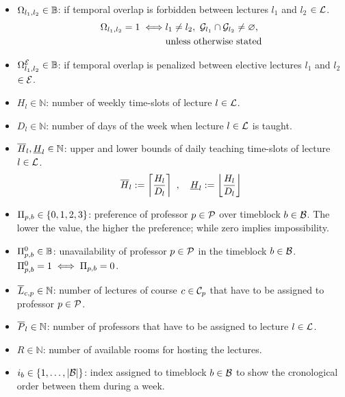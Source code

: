         \begin{itemize}
            \item $\Omega_{l_1,l_2} \in \mathbb{B}$: if temporal overlap is forbidden between lectures $l_1$ and $l_2$ $\in \mathcal{L}$.
            \begin{equation}
                \begin{split}
                    \overlap{l_1}{l_2}=1 \iff & l_1\neq l_2, \ \groups_{l_1} \cap \groups_{l_2} \neq \varnothing, \\                              & \text{unless otherwise stated}
                \end{split}
                \label{eq:overlap_condition}
            \end{equation}
            \item $\Omega_{l_1,l_2}^{\mathcal{E}} \in \mathbb{B}$: if temporal overlap is penalized between elective lectures $l_1$ and $l_2$ $\in \mathcal{E}$.
            \item $H_l \in \mathbb{N}$: number of weekly time-slots of lecture $l\in\mathcal{L}$.
            \item $D_l \in \mathbb{N}$: number of days of the week when lecture $l\in\mathcal{L}$ is taught.
            \item $\overline{H}_{l}, \underline{H}_{l} \in \mathbb{N}$: upper and lower bounds of daily teaching time-slots of lecture $l\in\mathcal{L}$.
            \begin{equation}
                \overline{H}_{l} := \left\lceil \frac{H_l}{D_l} \right\rceil  \ , \quad \underline{H}_{l} :=  \left\lfloor \frac{H_l}{D_l} \right\rfloor
                \nonumber
            \end{equation}
            \item $\Pi_{p,b} \in \{0,1,2,3\}$: preference of professor $p\in\mathcal{P}$ over timeblock $b\in\mathcal{B}$. The lower the value, the higher the preference; while zero implies impossibility.
            \item $\Pi^0_{p,b} \in \mathbb{B}$: unavailability of professor $p\in\mathcal{P}$ in the timeblock $b\in\mathcal{B}$. $\Pi^0_{p,b}=1 \iff \Pi_{p,b}=0$.
            \item $\overline{L}_{c,p} \in \mathbb{N}$: number of lectures of course $c\in\mathcal{C}_p$ that have to be assigned to professor $p\in\mathcal{P}$.
            \item $\overline{P}_{l} \in \mathbb{N}$: number of professors that have to be assigned to lecture $l\in\mathcal{L}$.
            \item $R\in\mathbb{N}$: number of available rooms for hosting the lectures.
            \item $i_b\in\{1,\dots,|\mathcal{B}|\}$: index assigned to timeblock $b\in\mathcal{B}$ to show the cronological order between them during a week.
        \end{itemize}

